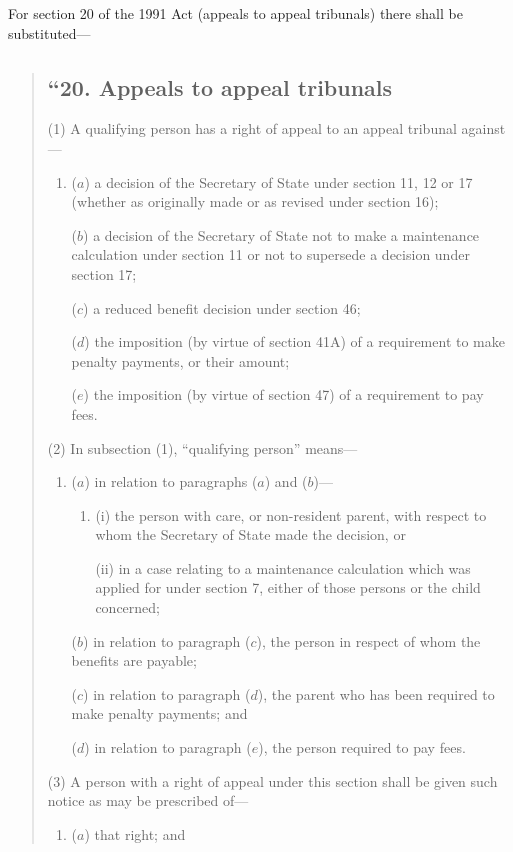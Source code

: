 \documentclass[12pt,a4paper]{article}
\begin{document}
For section 20 of the 1991 Act (appeals to appeal tribunals) there shall be substituted—
\begin{quotation}
\subsection*{“20. Appeals to appeal tribunals}

(1) A qualifying person has a right of appeal to an appeal tribunal against—
\begin{enumerate}\item[]
($a$) a decision of the Secretary of State under section 11, 12 or 17 (whether as originally made or as revised under section 16);

($b$) a decision of the Secretary of State not to make a maintenance calculation under section 11 or not to supersede a decision under section 17;

($c$) a reduced benefit decision under section 46;

($d$) the imposition (by virtue of section 41A) of a requirement to make penalty payments, or their amount;

($e$) the imposition (by virtue of section 47) of a requirement to pay fees.
\end{enumerate}

(2) In subsection (1), “qualifying person” means—
\begin{enumerate}\item[]
($a$) in relation to paragraphs ($a$)  and ($b$)—
\begin{enumerate}\item[]
(i) the person with care, or non-resident parent, with respect to whom the Secretary of State made the decision, or

(ii) in a case relating to a maintenance calculation which was applied for under section 7, either of those persons or the child concerned;
\end{enumerate}

($b$) in relation to paragraph ($c$), the person in respect of whom the benefits are payable;

($c$) in relation to paragraph ($d$), the parent who has been required to make penalty payments; and

($d$) in relation to paragraph ($e$), the person required to pay fees.
\end{enumerate}

(3) A person with a right of appeal under this section shall be given such notice as may be prescribed of—
\begin{enumerate}\item[]
($a$) that right; and


\end{enumerate}
\end{quotation}
\end{document}
